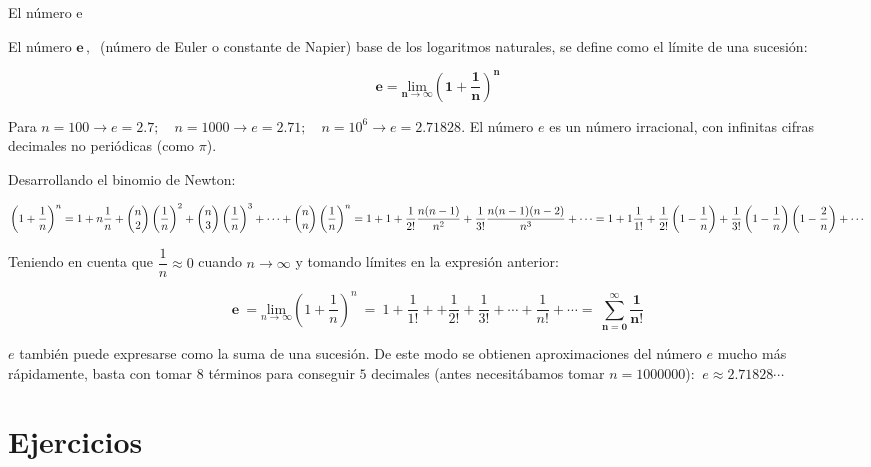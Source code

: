 \begin{myexampleblock}{El número e}

El número $ \boldsymbol e \, , \  $ (número de Euler o constante de Napier) base de los logaritmos naturales,  se define como el límite de una sucesión: 

$$\boldsymbol{ e=\underset{n\to \infty}{\mathrm{lim}} \left( 1+\dfrac 1 n \right)^n}$$

\vspace{2mm} Para $n=100 \to e=2.7;\quad n=1000\to e=2.71;\quad n=10^6 \to e=2.71828$. El número $e$ es un número irracional, con infinitas cifras decimales no periódicas (como $\pi$).

\vspace{2mm} Desarrollando el binomio de Newton:

\vspace{2mm} $\left( 1+\dfrac 1 n \right)^n=1+n\dfrac 1 n + \mqty(n\\2) \left( \dfrac 1 n \right)^2+\mqty(n\\3) \left( \dfrac 1 n \right)^3+ \cdots + \mqty(n\\n) \left( \dfrac 1 n \right)^n=1+1+\dfrac {1}{2!} \dfrac{n(n-1)}{n^2}+ \dfrac {1}{3!} \dfrac{n(n-1)(n-2)}{n^3}+ \cdots = 1+1\dfrac{1}{1!} +\dfrac{1}{2!} \left(1-\dfrac 1 n \right)+\dfrac{1}{3!} \left(1-\dfrac 1 n \right)\left(1-\dfrac 2 n \right)+\cdots$

\vspace{2mm} Teniendo en cuenta que $\dfrac 1 n \approx 0$ cuando $n \to \infty$ y tomando límites en la expresión anterior:

$$\boldsymbol{e} \ =\underset{n\to \infty}{\mathrm{lim}} \left( 1+\dfrac 1 n \right)^n \ = \ 1+\dfrac {1}{1!} + +\dfrac {1}{2!} +\dfrac {1}{3!} + \cdots +\dfrac {1}{n!} + \cdots = \ \boldsymbol{\sum_{n=0}^\infty \dfrac {1}{n!}}$$ 

\vspace{2mm} $e$ también puede expresarse como la suma de una sucesión. De este modo se obtienen aproximaciones  del número $e$ mucho más rápidamente, basta con tomar $8$ términos para conseguir $5$ decimales (antes necesitábamos tomar $n=1000000$): $\ e\approx 2.71828\cdots$

\vspace{2mm} 
	
\end{myexampleblock}



\vspace{1cm}
\section{Ejercicios}
\vspace{0.5cm}

